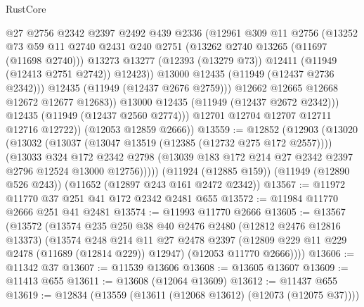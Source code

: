 \begin{lexlean}{RustCore}
\begin{coremodule}
                      @27
                      @2756
                      @2342
                      @2397
                      @2492
                      @439
                      @2336
                      (@12961
                        @309
                        @11
                        @2756
                        (@13252
                          @73
                          @59
                          @11
                          @2740
                          @2431
                          @240
                          @2751
                          (@13262 @2740 @13265 (@11697 (@11698 @2740)))
                          @13273
                          @13277
                          (@12393 (@13279 @73))
                          @12411
                          (@11949 (@12413 @2751 @2742))
                          @12423))
                      @13000
                      @12435
                      (@11949 (@12437 @2736 @2342)))
                    @12435
                    (@11949 (@12437 @2676 @2759)))
                  @12662
                  @12665
                  @12668
                  @12672
                  @12677
                  @12683))
              @13000
              @12435
              (@11949 (@12437 @2672 @2342)))
            @12435
            (@11949 (@12437 @2560 @2774)))
          @12701
          @12704
          @12707
          @12711
          @12716
          @12722))
      (@12053 @12859 @2666))
@13559 := @12852
    (@12903
      (@13020
        (@13032
          (@13037 (@13047 @13519 (@12385 (@12732 @275 @172 @2557))))
          (@13033
            @324
            @172
            @2342
            @2798
            (@13039 @183 @172 @214 @27 @2342 @2397 @2796 @12524 @13000 @12756)))))
    (@11924 (@12885 @159))
    (@11949 (@12890 @526 @243))
    (@11652 (@12897 @243 @161 @2472 @2342))
@13567 := @11972 @11770 @37 @251 @41 @172 @2342 @2481 @655
@13572 := @11984 @11770 @2666 @251 @41 @2481
@13574 := @11993 @11770 @2666
@13605 := @13567
    (@13572
      (@13574
        @235
        @250
        @38
        @40
        @2476
        @2480
        (@12812 @2476 @12816 @13373)
        (@13574
          @248
          @214
          @11
          @27
          @2478
          @2397
          (@12809 @229 @11 @229 @2478 (@11689 (@12814 @229)) @12947)
          (@12053 @11770 @2666))))
@13606 := @11342 @37
@13607 := @11539 @13606
@13608 := @13605 @13607
@13609 := @11413 @655
@13611 := @13608 (@12064 @13609)
@13612 := @11437 @655
@13619 := @12834 (@13559 (@13611 (@12068 @13612) (@12073 (@12075 @37))))

\end{coremodule}
\end{lexlean}
